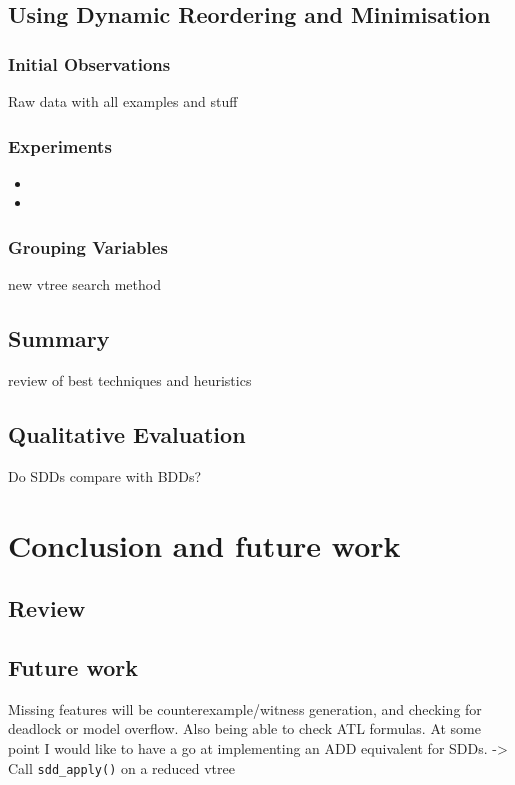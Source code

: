 \documentclass[11pt]{article}
\begin{document}
\subsection{Using Dynamic Reordering and Minimisation}

\subsubsection{Initial Observations}

Raw data with all examples and stuff 

\subsubsection{Experiments}

\begin{itemize}
\item 
\item 
\end{itemize}

\subsubsection{Grouping Variables}
new vtree search method 
\subsection{Summary}

review of best techniques and heuristics

\subsection{Qualitative Evaluation}

Do SDDs compare with BDDs?

\section{Conclusion and future work}

\subsection{Review}

\subsection{Future work}

Missing features will be counterexample/witness generation, and checking for deadlock or model overflow. Also being able to check ATL formulas.
At some point I would like to have a go at implementing an ADD equivalent for SDDs.
-> Call \texttt{sdd\_apply()} on a reduced vtree
\end{document}
